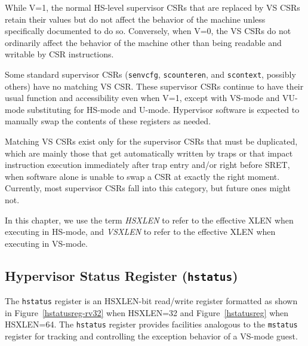 While V=1, the normal HS-level supervisor CSRs that are replaced by
VS CSRs retain their values but do
not affect the behavior of the machine unless specifically documented to
do so.
Conversely, when V=0, the VS CSRs do not ordinarily affect the behavior of
the machine other than being readable and writable by CSR instructions.

Some standard supervisor CSRs ({\tt senvcfg},
{\tt scounteren}, and {\tt scontext},
possibly others) have no matching VS CSR.
These supervisor CSRs continue to have their usual function and
accessibility even when V=1, except with VS-mode and VU-mode substituting for
HS-mode and U-mode.
Hypervisor software is expected to manually swap the contents of these
registers as needed.

\begin{commentary}
Matching VS CSRs exist only for the supervisor CSRs that must be
duplicated, which are mainly those that get automatically written by
traps or that impact instruction execution immediately after trap entry
and/or right before SRET, when software alone is unable to swap a CSR at
exactly the right moment.
Currently, most supervisor CSRs fall into this category, but future ones
might not.
\end{commentary}

In this chapter, we use the term {\em HSXLEN} to refer to the effective XLEN
when executing in HS-mode, and {\em VSXLEN} to refer to the effective
XLEN when executing in VS-mode.

\subsection{Hypervisor Status Register ({\tt hstatus})}

The {\tt hstatus} register is an HSXLEN-bit read/write register
formatted as shown in Figure~\ref{hstatusreg-rv32} when HSXLEN=32 and
Figure~\ref{hstatusreg} when HSXLEN=64.
The {\tt hstatus}
register provides facilities analogous to the {\tt mstatus} register
for tracking and controlling the exception behavior of a VS-mode guest.

